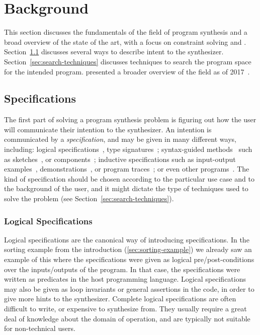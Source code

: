 \section{Background}
\label{sec:background}

This section discusses the fundamentals of the field of program synthesis and a
broad overview of the state of the art, with a focus on constraint solving and
.
Section~\ref{sec:specifications} discusses several ways to describe intent to
the synthesizer.
Section~\ref{sec:search-techniques} discusses techniques to search the program
space for the intended program.
\citeauthor{Gulwani2017} presented a broader overview of the field as of
2017~\cite{Gulwani2017}.

\subsection{Specifications}
\label{sec:specifications}

The first part of solving a program synthesis problem is figuring out how the
user will communicate their intention to the synthesizer. An intention is
communicated by a \textit{specification}, and may be given in many different
ways, including:
logical specifications~\cite{Itzhaky:SIS:2010},
type signatures~\cite{Osera:2015:TPS,
  Frankle:2016:EST, Polikarpova:2016:PSP};
syntax-guided methods~\cite{Alur:sygus:2013} such as
sketches~\cite{Solar-Lezama:2008}, or components~\cite{Feng:2017:CST,
Feng:2017:CSC, Feng:2018:PSU, Shi:2019:FCS};
inductive specifications such as input-output examples~\cite{Frankle:2016:EST,
Gulwani:2012:SDM, Leung:2015:IPS}, demonstrations~\cite{Lau2003}, or program
traces~\cite{Lau:traces:2003};
or even other programs~\cite{Srivastava:2011:PIS}.
The kind of specification should be chosen according to the particular use case
and to the background of the user, and it might dictate the type of techniques
used to solve the problem (see Section~\ref{sec:search-techniques}).

\subsubsection{Logical Specifications}
\label{sec:logical}

Logical specifications are the canonical way of introducing specifications. In
the sorting example from the introduction (\ref{sec:sorting-example}) we already
saw an example of this where the specifications were given as logical
pre/post-conditions over the inputs/outputs of the program. In that case, the
specifications were written as predicates in the host programming language.
Logical specifications may also be given as loop invariants or general
assertions in the code, in order to give more hints to the
synthesizer.
Complete logical specifications are often difficult to write, or expensive to
synthesize from.
They usually require a great deal of knowledge about the domain of operation,
and are typically not suitable for non-technical users.

